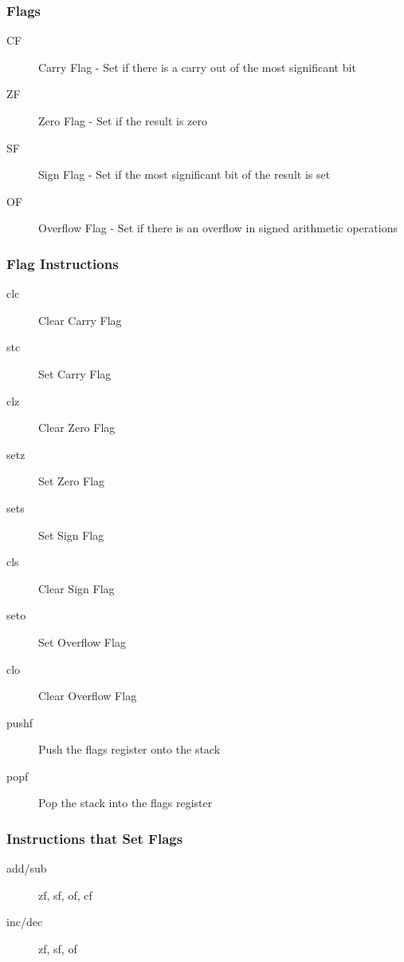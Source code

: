 \subsubsection*{Flags}
\begin{description}
    \item[CF] Carry Flag - Set if there is a carry out of the most significant bit
    \item[ZF] Zero Flag - Set if the result is zero
    \item[SF] Sign Flag - Set if the most significant bit of the result is set
    \item[OF] Overflow Flag - Set if there is an overflow in signed arithmetic operations
\end{description}

\subsubsection*{Flag Instructions}
\begin{description}
    \item[clc] Clear Carry Flag
    \item[stc] Set Carry Flag
    \item[clz] Clear Zero Flag
    \item[setz] Set Zero Flag
    \item[sets] Set Sign Flag
    \item[cls] Clear Sign Flag
    \item[seto] Set Overflow Flag
    \item[clo] Clear Overflow Flag
    \item[pushf] Push the flags register onto the stack
    \item[popf] Pop the stack into the flags register
\end{description}

\subsubsection*{Instructions that Set Flags}
\begin{description}
    \item[add/sub] zf, sf, of, cf
    \item[inc/dec] zf, sf, of  
\end{description}